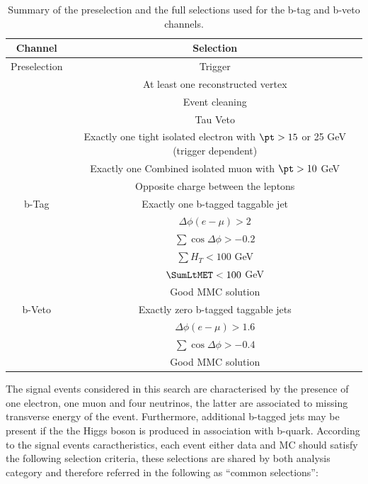 \begin{table}[t]
  \begin{center}
   \begin{footnotesize}	
    \begin{tabular}{cc}
      \hline \hline
      Channel & Selection \\
      \hline
      Preselection 	&  Trigger \\
	&	At least one reconstructed vertex \\
	&	Event cleaning	\\
	&	Tau Veto \\
	& 	Exactly one tight isolated electron with $\pt > 15 $ or 25 GeV (trigger dependent) \\
	&	Exactly one Combined isolated muon with  $\pt > 10$ GeV \\
	& 	Opposite charge between the leptons \\ 
      \hline
      b-Tag & Exactly one b-tagged taggable jet \\
      & $\Delta\phi(e-\mu)>2$ \\
      & $\sum\cos\Delta\phi > -0.2$ \\
      & $\sum H_T < 100$ GeV \\
      & $\SumLtMET < 100$ GeV \\
      & Good MMC solution \\
      \hline
      b-Veto & Exactly zero b-tagged taggable jets \\	
      & $\Delta\phi(e-\mu)>1.6$ \\
      & $\sum\cos\Delta\phi > -0.4$ \\
      & Good MMC solution \\
      \hline \hline
    \end{tabular}
    \caption{Summary of the preselection and the full selections used for the b-tag and b-veto channels.}
    \label{tab:sel}
  \end{footnotesize}
  \end{center}
\end{table}



The signal events considered in this search are  characterised by the presence of one electron, one muon and 
four neutrinos, the latter are associated to missing transverse energy of the event. Furthermore, 
additional b-tagged jets may be present if the the Higgs boson is produced in association with b-quark.
According to the signal events caractheristics, each event either data and MC should satisfy
the following selection criteria, these selections are shared by both analysis category and therefore 
referred in the following as ``common selections'':


